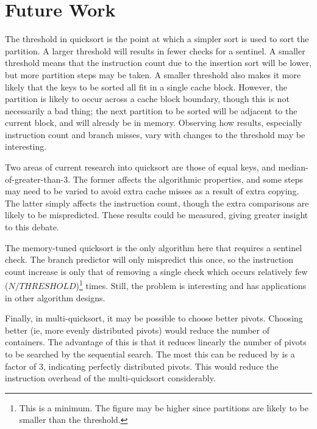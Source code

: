 
\section{Future Work}
The threshold in quicksort is the point at which a simpler sort is used to sort
the partition. A larger threshold will results in fewer checks for a sentinel. A
smaller threshold means that the instruction count due to the insertion sort
will be lower, but more partition steps may be taken. A smaller threshold also
makes it more likely that the keys to be sorted all fit in a single cache
block. However, the partition is likely to occur across a cache block boundary,
though this is not necessarily a bad thing; the next partition to be sorted will
be adjacent to the current block, and will already be in memory. Observing how
results, especially instruction count and branch misses, vary with changes 
to the threshold may be interesting.

Two areas of current research into quicksort are those of equal keys, and
median-of-greater-than-3. The former affects the algorithmic properties, and
some steps may need to be varied to avoid extra cache misses as a result
of extra copying. The latter simply affects the instruction count, though the
extra comparisons are likely to be mispredicted. These results could be
measured, giving greater insight to this debate.

The memory-tuned quicksort is the only algorithm here that requires a sentinel
check. The branch predictor will only mispredict this once, so the instruction
count increase is only that of removing a single check which occurs relatively
few ($N / THRESHOLD$)\footnote{This is a minimum. The figure may be higher since
partitions are likely to be smaller than the threshold.} times. Still, the
problem is interesting and has applications in other algorithm designs.

Finally, in multi-quicksort, it may be possible to choose better pivots.
Choosing better (ie, more evenly distributed pivots) would reduce the number of
containers. The advantage of this is that it reduces linearly the number of
pivots to be searched by the sequential search. The most this can be reduced by
is a factor of 3, indicating perfectly distributed pivots. This would reduce the
instruction overhead of the multi-quicksort considerably.
